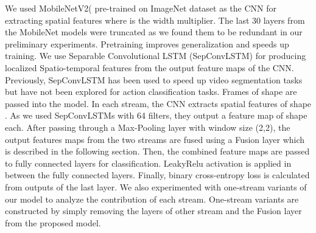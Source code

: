 \documentclass[conference]{IEEEtran}
\begin{document}
We used MobileNetV2( \cite{sandler2018mobilenetv2} pre-trained on ImageNet dataset \cite{krizhevsky2012imagenet} as the CNN for extracting spatial features where  is the width multiplier. The last 30 layers from the MobileNet models were truncated as we found them to be redundant in our preliminary experiments. Pretraining improves generalization and speeds up training. We use Separable Convolutional LSTM (SepConvLSTM) for producing localized Spatio-temporal features from the output feature maps of the CNN. Previously, SepConvLSTM has been used to speed up video segmentation tasks \cite{pfeuffer2019separable} but have not been explored for action classification tasks. Frames of shape  are passed into the model. In each stream, the CNN extracts spatial features of shape . As we used SepConvLSTMs with 64 filters, they output a feature map of shape  each. After passing through a Max-Pooling layer with window size (2,2), the output features maps from the two streams are fused using a Fusion layer which is described in the following section. Then, the combined feature maps are passed to fully connected layers for classification. LeakyRelu \cite{xu2015empirical} activation is applied in between the fully connected layers. Finally, binary cross-entropy loss is calculated from outputs of the last layer.
We also experimented with one-stream variants of our model to analyze the contribution of each stream. One-stream variants are constructed by simply removing the layers of other stream and the Fusion layer from the proposed model.
\end{document}
